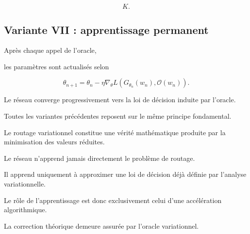 \[
K.
\]


\subsection{Variante VII : apprentissage permanent}

Après chaque appel de l'oracle,

les paramètres sont actualisés selon

\[
\theta_{n+1}
=
\theta_n
-
\eta
\nabla_\theta
L
\left(
G_{\theta_n}(w_n),
\mathcal O(w_n)
\right).
\]

Le réseau converge progressivement vers la loi de décision induite par
l'oracle.


\begin{remark}

Toutes les variantes précédentes reposent sur le même principe fondamental.

Le routage variationnel constitue une vérité mathématique produite par la
minimisation des valeurs réduites.

Le réseau n'apprend jamais directement le problème de routage.

Il apprend uniquement à approximer une loi de décision déjà définie par
l'analyse variationnelle.

Le rôle de l'apprentissage est donc exclusivement celui d'une accélération
algorithmique.

La correction théorique demeure assurée par l'oracle variationnel.

\end{remark}


